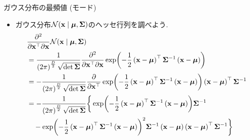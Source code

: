 \documentclass[dvipdfmx,notheorems,t]{beamer}
\begin{document}
\begin{frame}{ガウス分布の最頻値 (モード)}
\begin{itemize}
  \item ガウス分布$\mathcal{N}(\vb{x} \mid \vb*{\mu}, \vb{\Sigma})$のヘッセ行列を調べよう.
  {\small \begin{align*}
    & \frac{\partial^2}{\partial \vb{x}^\top \partial \vb{x}} \mathcal{N}(\vb{x} \mid \vb*{\mu}, \vb{\Sigma}) \\
    &= \frac{1}{\left( 2\pi \right)^\frac{D}{2} \sqrt{\det \vb{\Sigma}}}
      \frac{\partial^2}{\partial \vb{x}^\top \partial \vb{x}}
      \exp(-\frac{1}{2} \left( \vb{x} - \vb*{\mu} \right)^\top \vb{\Sigma}^{-1}
      \left( \vb{x} - \vb*{\mu} \right)) \\
    &= -\frac{1}{\left( 2\pi \right)^\frac{D}{2} \sqrt{\det \vb{\Sigma}}}
      \pdv{\vb{x}^\top} \exp(-\frac{1}{2} \left( \vb{x} - \vb*{\mu} \right)^\top \vb{\Sigma}^{-1}
      \left( \vb{x} - \vb*{\mu} \right))
      \left( \vb{x} - \vb*{\mu} \right)^\top \vb{\Sigma}^{-1} \\
    &= -\frac{1}{\left( 2\pi \right)^\frac{D}{2} \sqrt{\det \vb{\Sigma}}}
      \bigg\{ \exp(-\frac{1}{2} \left( \vb{x} - \vb*{\mu} \right)^\top \vb{\Sigma}^{-1}
      \left( \vb{x} - \vb*{\mu} \right)) \vb{\Sigma}^{-1} \\
    & \quad - \exp(-\frac{1}{2} \left( \vb{x} - \vb*{\mu} \right)^\top \vb{\Sigma}^{-1}
      \left( \vb{x} - \vb*{\mu} \right))^2
      \vb{\Sigma}^{-1} \left( \vb{x} - \vb*{\mu} \right)
      \left( \vb{x} - \vb*{\mu} \right)^\top \vb{\Sigma}^{-1} \bigg\}
  \end{align*}}
\end{itemize}
\end{frame}
\end{document}
